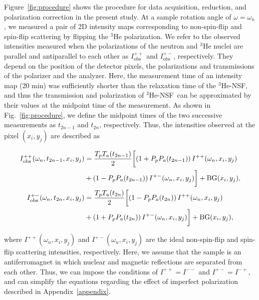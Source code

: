 \documentclass[%
 reprint,
superscriptaddress,
 amsmath,amssymb,
 aps,
floatfix,
]{revtex4-2}
\newcommand{\He}{$^3$He }
\newcommand{\Hensf}{$^3$He-NSF}
\begin{document}
Figure~\ref{fig:procedure} shows the procedure for data acquisition, reduction, and polarization correction in the present study.
At a sample rotation angle of $\omega=\omega_n$, we measured a pair of 2D intensity maps corresponding to non-spin-flip and spin-flip scattering by flipping the \He polarization.
We refer to the observed intensities measured when the polarizations of the neutron and \He nuclei are parallel and antiparallel to each other as $I^{++}_\mathrm{obs}$ and $I^{+-}_\mathrm{obs}$, respectively.
They depend on the position of the detector pixels, the polarizations and transmissions of the polarizer and the analyzer.
Here, the measurement time of an intensity map (20 min) was sufficiently shorter than the relaxation time of the \Hensf, and thus the transmission and polarization of \Hensf\ can be approximated by their values at the midpoint time of the measurement.
As shown in Fig.~\ref{fig:procedure}, we define the midpoint times of the two successive measurements as $t_{2n-1}$ and $t_{2n}$, respectively.
Thus, the intensities observed at the pixel $(x_i, y_j)$ are described as
\begin{widetext}
    \begin{align}
        I^{++}_\mathrm{obs}(\omega_n,t_{2n-1}, x_i,y_j) &= \frac{T_pT_a(t_{2n-1})}{2}\biggl[\left(1+ P_pP_a(t_{2n-1})\right)I^{++}(\omega_n, x_i,y_j) \notag\\
        &+\left(1- P_pP_a(t_{2n-1})\right)I^{+-}(\omega_n, x_i,y_j)\biggr]+\mathrm{BG}(x_i,y_j),
        \label{eq:int_obs_pp}\\
        I^{+-}_\mathrm{obs}(\omega_n,t_{2n}, x_i,y_j) &= \frac{T_pT_a(t_{2n})}{2}\biggl[\left(1- P_pP_a(t_{2n})\right)I^{++}(\omega_n, x_i,y_j) \notag\\
        &+\left(1+ P_pP_a(t_{2n})\right)I^{+-}(\omega_n, x_i,y_j)\biggr]+\mathrm{BG}(x_i,y_j),
        \label{eq:int_obs_pm}
    \end{align}
\end{widetext}
where $I^{++}(\omega_n,x_i,y_j)$ and $I^{+-}(\omega_n,x_i,y_j)$ are the ideal non-spin-flip and spin-flip scattering intensities, respectively.
Here, we assume that the sample is an antiferromagnet in which nuclear and magnetic reflections are separated from each other.
Thus, we can impose the conditions of $I^{++} = I^{--}$ and $I^{+-} = I^{-+}$, and can simplify the equations regarding the effect of imperfect polarization described in Appendix~\ref{appendix}.
\end{document}
